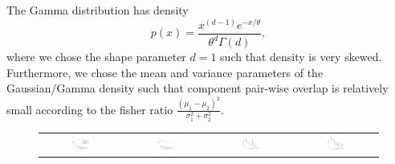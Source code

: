 \documentclass{article}
\begin{document}

The Gamma distribution has density 
$$p(x)=\frac{x^{(d-1)}e^{-x/\theta}}{\theta^d \Gamma(d)},$$ 
where we chose the shape parameter $d=1$ such that density is very skewed. Furthermore, we chose the mean and variance parameters of the Gaussian/Gamma density such that component pair-wise overlap is relatively small according to the fisher ratio $\frac{(\mu_1 - \mu_2)^2}{\sigma_1^2+\sigma_2^2}$. 

\begin{figure}[!t]
  \hspace{-7mm}
  \renewcommand{\tabcolsep}{1pt}
  \begin{tabular}{cccc}
    \includegraphics[width=0.26\textwidth]{../experiment/figure/sp_diff_gauss_k_2_view_1-crop} &      
    \includegraphics[width=0.26\textwidth]{../experiment/figure/sp_diff_gauss_k_3_view_1-crop} &      
    \includegraphics[width=0.26\textwidth]{../experiment/figure/sp_diff_gauss_k_4_view_1-crop} &    
    \includegraphics[width=0.26\textwidth]{../experiment/figure/sp_diff_gauss_k_8_view_1-crop} \\    

\end{tabular}
\end{figure}
\end{document}
